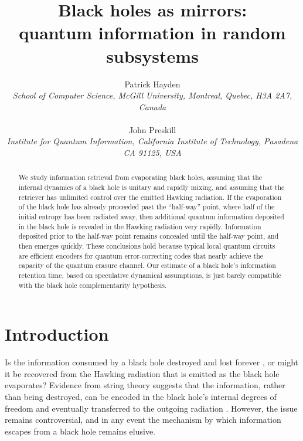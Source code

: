 \documentclass[12pt]{article}
\begin{document}
\title{\bf Black holes as mirrors: \\quantum information in random subsystems}
\author{Patrick Hayden\\
{\em \small School of Computer Science, McGill University, Montreal, Quebec, H3A 2A7, Canada}\\ \\
John Preskill\\
{\em \small Institute for Quantum Information, California Institute of Technology, Pasadena CA 91125, USA}}
\date{}
\maketitle

\begin{abstract}
We study information retrieval from evaporating black holes, assuming that the internal dynamics of a black hole is unitary and rapidly mixing, and assuming that the retriever has unlimited control over the emitted Hawking radiation. If the evaporation of the black hole has already proceeded past the ``half-way'' point, where half of the initial entropy has been radiated away, then additional quantum information deposited in the black hole is revealed in the Hawking radiation very rapidly. Information deposited prior to the half-way point remains concealed until the half-way point, and then emerges quickly. These conclusions hold because typical local quantum circuits are efficient encoders for quantum error-correcting codes that nearly achieve the capacity of the quantum erasure channel. Our estimate of a black hole's information retention time, based on speculative dynamical assumptions, is just barely compatible with the black hole complementarity hypothesis. 


\end{abstract}

\section{Introduction}
Is the information consumed by a black hole destroyed and lost forever \cite{hawk2}, or might it be recovered from the Hawking radiation that is emitted as the black hole evaporates? Evidence from string theory suggests that the information, rather than being destroyed, can be encoded in the black hole's internal degrees of freedom and eventually transferred to the outgoing radiation \cite{strominger-vafa,ads-cft}. However, the issue remains controversial, and in any event the mechanism by which information escapes from a black hole remains elusive.
\end{document}
